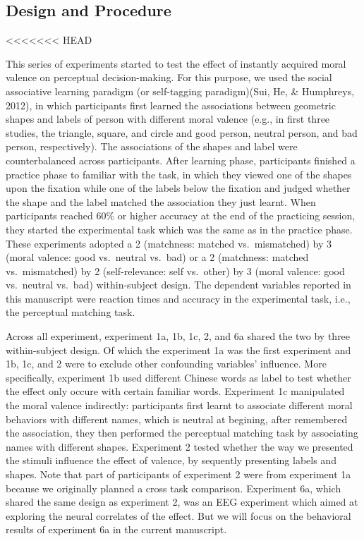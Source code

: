\documentclass[
  man]{apa6}
\begin{document}
\hypertarget{design-and-procedure}{%
\subsection{Design and Procedure}\label{design-and-procedure}}
<<<<<<< HEAD

This series of experiments started to test the effect of instantly acquired moral valence on perceptual decision-making. For this purpose, we used the social associative learning paradigm (or self-tagging paradigm)(Sui, He, \& Humphreys, 2012), in which participants first learned the associations between geometric shapes and labels of person with different moral valence (e.g., in first three studies, the triangle, square, and circle and good person, neutral person, and bad person, respectively). The associations of the shapes and label were counterbalanced across participants. After learning phase, participants finished a practice phase to familiar with the task, in which they viewed one of the shapes upon the fixation while one of the labels below the fixation and judged whether the shape and the label matched the association they just learnt. When participants reached 60\% or higher accuracy at the end of the practicing session, they started the experimental task which was the same as in the practice phase. These experiments adopted a 2 (matchness: matched vs.~mismatched) by 3 (moral valence: good vs.~neutral vs.~bad) or a 2 (matchness: matched vs.~mismatched) by 2 (self-relevance: self vs.~other) by 3 (moral valence: good vs.~neutral vs.~bad) within-subject design. The dependent variables reported in this manuscript were reaction times and accuracy in the experimental task, i.e., the perceptual matching task.

Across all experiment, experiment 1a, 1b, 1c, 2, and 6a shared the two by three within-subject design. Of which the experiment 1a was the first experiment and 1b, 1c, and 2 were to exclude other confounding variables' influence. More specifically, experiment 1b used different Chinese words as label to test whether the effect only occure with certain familiar words. Experiment 1c manipulated the moral valence indirectly: participants first learnt to associate different moral behaviors with different names, which is neutral at begining, after remembered the association, they then performed the perceptual matching task by associating names with different shapes. Experiment 2 tested whether the way we presented the stimuli influence the effect of valence, by sequently presenting labels and shapes. Note that part of participants of experiment 2 were from experiment 1a because we originally planned a cross task comparison. Experiment 6a, which shared the same design as experiment 2, was an EEG experiment which aimed at exploring the neural correlates of the effect. But we will focus on the behavioral results of experiment 6a in the current manuscript.
\end{document}
